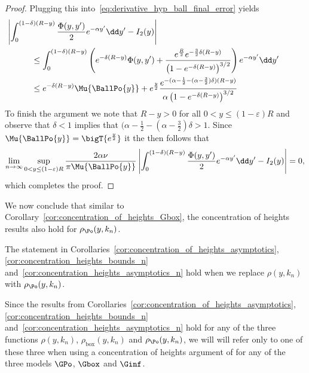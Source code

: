 \begin{proof}
Plugging this into~\eqref{eq:derivative_hyp_ball_final_error} yields
\begin{align*}
	&\hspace{-30pt}\left|\int_0^{(1-\delta)(R- y)} \frac{\Phi(y,y^\prime)}{2} e^{-\alpha y^\prime} \dd y^\prime 
			- I_2(y)\right|\\
	&\le \int_0^{(1-\delta)(R- y)} \left(e^{-\delta(R-y)} \Phi(y,y^\prime) + 
		\frac{e^{\frac{R}{2}}e^{-\frac{3}{2}\delta(R-y)}}{\left(1 - e^{-\delta(R-y)}\right)^{3/2}}\right)
		e^{-\alpha y^\prime} \dd y^\prime \\
	&\le e^{-\delta(R-y)} \Mu{\BallPo{y}} + e^{\frac{y}{2}} \frac{e^{-(\alpha - \frac{1}{2} - (\alpha - \frac{3}{2})\delta)(R-y)}}
		{\alpha \left(1 - e^{-\delta(R-y)}\right)^{3/2}}
\end{align*}
To finish the argument we note that $R-y > 0$ for all $0 < y \le (1-\varepsilon)R$ and observe that $\delta < 1$ implies that $(\alpha - \frac{1}{2} - (\alpha - \frac{3}{2})\delta > 1$. Since $\Mu{\BallPo{y}} = \bigT{e^{\frac{y}{2}}}$ it the
then follows that
\[
	\lim_{n \to \infty} \sup_{0 < y \le (1-\varepsilon)R} \frac{2\alpha \nu}{\pi \Mu{\BallPo{y}}}
	\left|\int_0^{(1-\delta)(R- y)} \frac{\Phi(y,y^\prime)}{2} e^{-\alpha y^\prime} \dd y^\prime - I_2(y)\right| = 0,
\]
which completes the proof.
\end{proof}

We now conclude that similar to Corollary~\ref{cor:concentration_of_heights_Gbox}, the concentration of heights results also hold for $\rho_{\Po}(y,k_n)$.

\begin{corollary}\label{cor:concentration_of_heights_GPo}
The statement in Corollaries~\ref{cor:concentration_of_heights_asymptotics}, \ref{cor:concentration_heights_bounds_n}
and~\ref{cor:concentration_heights_asymptotics_n} hold when we replace $\rho(y,k_n)$ with $\rho_{\Po}(y,k_n)$.
\end{corollary}

\begin{remark}
Since the results from Corollaries~\ref{cor:concentration_of_heights_asymptotics}, \ref{cor:concentration_heights_bounds_n} and~\ref{cor:concentration_heights_asymptotics_n} hold for any of the three functions $\rho(y,k_n)$, $\rho_{\text{box}}(y,k_n)$ and $\rho_{\Po}(y,k_n)$, we will will refer only to one of these three when using a concentration of heights argument of for any of the three models $\GPo$, $\Gbox$ and $\Ginf$. 
\end{remark}
